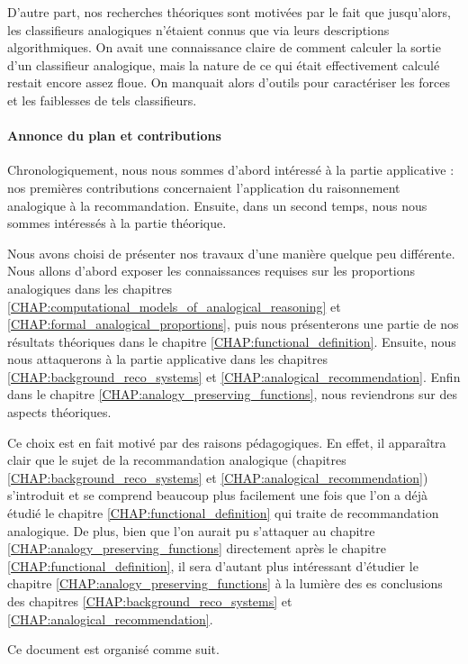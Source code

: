 D'autre part, nos recherches théoriques sont motivées par le fait que
jusqu'alors, les classifieurs analogiques n'étaient connus que via leurs
descriptions algorithmiques. On avait une connaissance claire de comment
calculer la sortie d'un classifieur analogique, mais la nature de ce qui était
effectivement calculé restait encore assez floue. On manquait alors d'outils
pour caractériser les forces et les faiblesses de tels classifieurs.

\paragraph{Annonce du plan et contributions\\}

Chronologiquement, nous nous sommes d'abord intéressé à la partie applicative :
nos premières contributions concernaient l'application du raisonnement
analogique à la recommandation. Ensuite, dans un second temps, nous nous sommes
intéressés à la partie théorique.

Nous avons choisi de présenter nos travaux d'une manière quelque peu
différente. Nous allons d'abord exposer les connaissances requises sur les
proportions analogiques dans les chapitres
\ref{CHAP:computational_models_of_analogical_reasoning}  et
\ref{CHAP:formal_analogical_proportions}, puis nous présenterons une partie de
nos résultats théoriques dans le chapitre  \ref{CHAP:functional_definition}.
Ensuite, nous nous attaquerons à la partie applicative dans les chapitres
\ref{CHAP:background_reco_systems} et \ref{CHAP:analogical_recommendation}.
Enfin dans le chapitre \ref{CHAP:analogy_preserving_functions},  nous
reviendrons sur des aspects théoriques.

Ce choix est en fait motivé par des raisons pédagogiques. En effet, il
apparaîtra clair que le sujet de la recommandation analogique (chapitres
\ref{CHAP:background_reco_systems} et \ref{CHAP:analogical_recommendation})
s'introduit et se comprend beaucoup plus facilement une fois que l'on a déjà
étudié le chapitre \ref{CHAP:functional_definition} qui traite de
recommandation analogique. De plus, bien que l'on aurait pu s'attaquer au
chapitre  \ref{CHAP:analogy_preserving_functions} directement après le chapitre
\ref{CHAP:functional_definition}, il sera d'autant plus intéressant d'étudier
le chapitre  \ref{CHAP:analogy_preserving_functions} à la lumière des es
conclusions des chapitres \ref{CHAP:background_reco_systems} et
\ref{CHAP:analogical_recommendation}.

Ce document est organisé comme suit.\\

